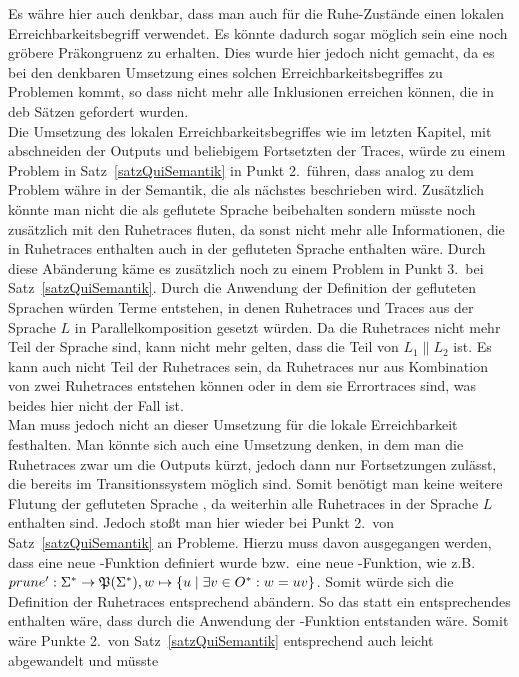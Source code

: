 Es währe hier auch denkbar, dass man auch für die Ruhe-Zustände einen lokalen
Erreichbarkeitsbegriff verwendet. Es könnte dadurch sogar möglich sein eine
noch gröbere Präkongruenz zu erhalten. Dies wurde hier jedoch nicht gemacht, da
es bei den denkbaren Umsetzung eines solchen Erreichbarkeitsbegriffes zu
Problemen kommt, so dass nicht mehr alle Inklusionen erreichen können, die in
deb Sätzen gefordert wurden.\\
Die Umsetzung des lokalen Erreichbarkeitsbegriffes wie im letzten Kapitel, mit
abschneiden der Outputs und beliebigem Fortsetzten der Traces, würde zu einem
Problem in Satz~\ref{satzQuiSemantik} in Punkt 2.\ führen, dass analog zu dem
Problem währe in der Semantik, die als nächstes beschrieben wird. Zusätzlich könnte
man nicht die \EL{} als geflutete Sprache beibehalten sondern müsste noch
zusätzlich mit den Ruhetraces fluten, da sonst nicht mehr alle
Informationen, die in Ruhetraces enthalten auch in der gefluteten Sprache
enthalten wäre. Durch diese Abänderung käme es zusätzlich noch zu einem Problem
in Punkt 3.\ bei Satz~\ref{satzQuiSemantik}. Durch die Anwendung der Definition
der gefluteten Sprachen würden Terme entstehen, in denen Ruhetraces und Traces
aus der Sprache $L$ in Parallelkomposition gesetzt würden. Da die Ruhetraces
nicht mehr Teil der Sprache sind, kann nicht mehr gelten, dass die Teil von
$L_1\|L_2$ ist. Es kann auch nicht Teil der Ruhetraces sein, da Ruhetraces nur
aus Kombination von zwei Ruhetraces entstehen können oder in dem sie
Errortraces sind, was beides hier nicht der Fall ist.\\
Man muss jedoch nicht an dieser Umsetzung für die lokale Erreichbarkeit
festhalten. Man könnte sich auch eine Umsetzung denken, in dem man die
Ruhetraces zwar um die Outputs kürzt, jedoch dann nur Fortsetzungen zulässt,
die bereits im Transitionssystem möglich sind. Somit benötigt man keine weitere
Flutung der gefluteten Sprache \EL{}, da weiterhin alle Ruhetraces in der
Sprache $L$ enthalten sind. Jedoch stoßt man hier wieder bei Punkt 2.\ von
Satz~\ref{satzQuiSemantik} an Probleme. Hierzu muss davon ausgegangen werden,
dass eine neue \prune{}-Funktion definiert wurde bzw.\ eine neue
\cont{}-Funktion, wie z.B. $prune'{}: \Sigma ^*\rightarrow
\mathfrak{P}(\Sigma ^*), w\mapsto \{u\mid \exists v\in O^*:w=uv\}$. Somit würde
sich die Definition der Ruhetraces entsprechend abändern. So das statt
\StQT{} ein entsprechendes \PrQT{} enthalten wäre, dass durch die Anwendung
der \prunenew{}-Funktion entstanden wäre. Somit wäre Punkte 2.\ von
Satz~\ref{satzQuiSemantik} entsprechend auch leicht abgewandelt und müsste
